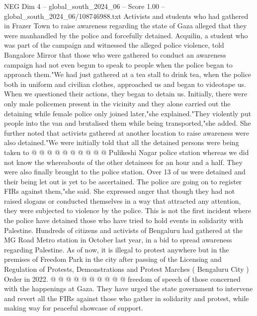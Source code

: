 \begin{textsample}{NEG Dim 4 – global\_south\_2024\_06 – Score 1.00 – global\_south\_2024\_06/108746988.txt}  \label{ex:f4_neg_375}
Activists and students who had gathered in Frazer Town to raise awareness regarding the state of Gaza alleged that they were manhandled by the police and forcefully detained.
Acquilin, a student who was part of the campaign and witnessed the alleged police violence, told Bangalore Mirror that those who were gathered to conduct an awareness campaign had not even begun to speak to people when the police began to approach them."We had just gathered at a tea stall to drink tea, when the police both in uniform and civilian clothes, approached us and began to videotape us.
When we questioned their actions, they began to detain us.
Initially, there were only male policemen present in the vicinity and they alone carried out the detaining while female police only joined later,"she explained."They violently put people into the van and brutalised them while being transported,"she added.
She further noted that activists gathered at another location to raise awareness were also detained."We were initially told that all the detained persons were being taken to @ @ @ @ @ @ @ @ @ @ Pulikeshi Nagar police station whereas we did not know the whereabouts of the other detainees for an hour and a half.
They were also finally brought to the police station.
Over 13 of us were detained and their being let out is yet to be ascertained.
The police are going on to register FIRs against them,"she said.
She expressed anger that though they had not raised slogans or conducted themselves in a way that attracted any attention, they were subjected to violence by the police.
This is not the first incident where the police have detained those who have tried to hold events in solidarity with Palestine.
Hundreds of citizens and activists of Bengaluru had gathered at the MG Road Metro station in October last year, in a bid to spread awareness regarding Palestine.
As of now, it is illegal to protest anywhere but in the premises of Freedom Park in the city after passing of the Licensing and Regulation of Protests, Demonstrations and Protest Marches ( Bengaluru City ) Order in 2022. @ @ @ @ @ @ @ @ @ @ freedom of speech of those concerned with the happenings at Gaza.
They have urged the state government to intervene and revert all the FIRs against those who gather in solidarity and protest, while making way for peaceful showcase of support.

\end{textsample}
